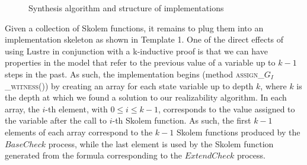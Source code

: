 \begin{figure}
\begin{minipage}[t]{0.65\textwidth}
\end{minipage}
\begin{minipage}[t]{0.33\textwidth}
\end{minipage}
\caption{Synthesis algorithm and structure of implementations}
\end{figure}

Given a collection of Skolem functions, it remains to plug them into
an implementation skeleton as shown in Template 1. One of the
direct effects of using Lustre in conjunction with a k-inductive proof
is that we can have properties in the model that refer to the
previous value of a variable up to $k-1$ steps in the past. As such,
the implementation begins (method \textsc{assign\_$G_{I}$\_witness()})
by creating an array for each state variable up to depth $k$, where
$k$ is the depth at which we found a solution to our realizability
algorithm. In each array, the $i$-th element, with $0\leq i \leq k-1$,
corresponds to the value assigned to the variable after the call to
$i$-th Skolem function. As such, the first $k-1$ elements of each array
correspond to the $k-1$ Skolem functions produced by the
$\mathit{BaseCheck}$ process, while the last element is used by the
Skolem function generated from the formula corresponding to the
$\mathit{ExtendCheck}$ process.

